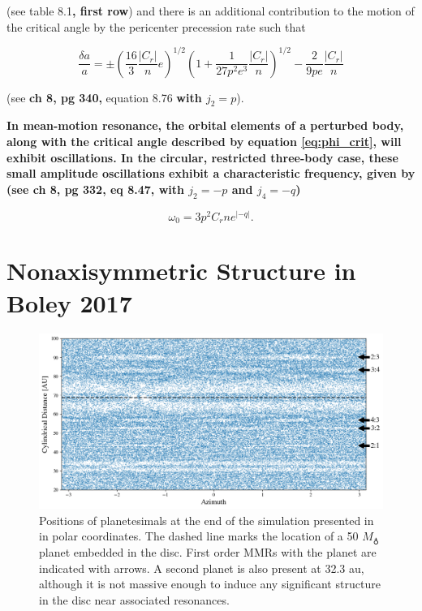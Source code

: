 \documentclass[fleqn,usenatbib]{mnras}
\begin{document}
\noindent (see \citet{1999ssd..book.....M} table 8.1\textbf{, first row}) and there is an additional contribution to the motion of the critical angle by the pericenter precession rate such that

\begin{equation}\label{eq:res_fo}
	\frac{\delta a}{a} = \pm \left(\frac{16}{3} \frac{\left| C_{r} \right|}{n} e \right)^{1/2} \left(  1 + \frac{1}{27 p^2 e^3} \frac{\left| C_{r} \right|}{n} 
	\right)^{1/2} - \frac{2}{9 p e}  \frac{\left| C_{r} \right|}{n}
\end{equation}

\noindent (see \citet{1999ssd..book.....M} \textbf{ch 8, pg 340,} equation 8.76 \textbf{with $j_{2} = p$}).

\textbf{In mean-motion resonance, the orbital elements of a perturbed body, along with the critical angle described by equation \ref{eq:phi_crit}, will exhibit oscillations. In the circular, restricted three-body case, these small amplitude oscillations exhibit a characteristic frequency, given by (see \citet{1999ssd..book.....M} ch 8, pg 332, eq 8.47, with $j_{2} =-p$ and $j_{4} = -q$)}

\begin{equation}\label{eq:lib_time}
	\omega_{0} = 3 p^{2} C_{r} n e^{\left| -q \right|}.
\end{equation}

\section{Nonaxisymmetric Structure in Boley 2017}\label{sec:boley_plot}

\begin{figure}
    \includegraphics[width=\textwidth]{figures/boley_rtheta.png}
    \caption{Positions of planetesimals at the end of the simulation presented in \citet{2017ApJ...850..103B} in polar coordinates. The dashed line marks the location of a 50 $M_{\earth}$ planet embedded in the disc. First order MMRs with the planet are indicated with arrows. A second planet is also present at 32.3 au, although it is not massive enough to induce any significant structure in the disc near associated resonances.\label{fig:boley_rtheta}}
\end{figure}
\end{document}
